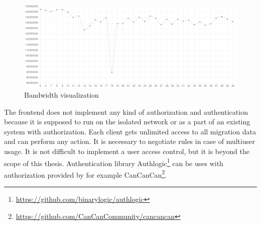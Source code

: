\begin{figure}[htb]
	\begin{center}
	\includegraphics[width=\textwidth]{themis-graph-bw-1457.png}
	\end{center}
	\caption{Bandwidth visualization}
	\label{img:themis-graph}
\end{figure}

The frontend does not implement any kind of authorization and authentication because it is supposed to run on the isolated network or as a part of an existing system with authorization. Each client gets unlimited access to all migration data and can perform any action. It is necessary to negotiate rules in case of multiuser usage. It is not difficult to implement a user access control, but it is beyond the scope of this thesis. Authentication library Authlogic\footnote{\url{https://github.com/binarylogic/authlogic}} can be uses with authorization provided by for example CanCanCan\footnote{\url{https://github.com/CanCanCommunity/cancancan}}.
